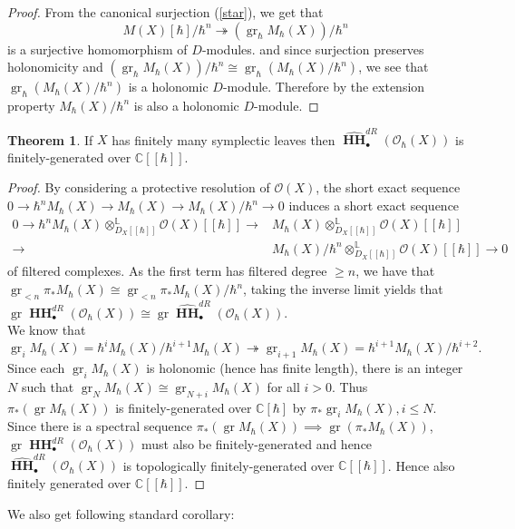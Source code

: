 \documentclass[draft]{article}
\theoremstyle{definition}
\newtheorem{theorem}{Theorem}[section]
\DeclareMathOperator{\gr}{gr}
\DeclareMathOperator{\HH}{\mathbf{HH}}
\newcommand{\doubleh}{[\![ \hbar ]\!]}
\newcommand{\OhX}{\mathcal{O}_\hbar(X)}
\newcommand{\MhX}{M_\hbar(X)}
\newcommand{\OXh}{\mathcal{O}(X)\doubleh}
\begin{document}
\begin{proof}
From the canonical surjection (\ref{star}), we get that $$M(X)[\hbar]/\hbar^n\twoheadrightarrow (\gr_\hbar \MhX)/\hbar^n$$ is a surjective homomorphism of $D$-modules. and since surjection preserves holonomicity and $(\gr_\hbar \MhX)/\hbar^n\cong \gr_\hbar (\MhX/\hbar^n)$, we see that $\gr_\hbar (\MhX/\hbar^n)$ is a holonomic $D$-module. Therefore by the extension property $\MhX/\hbar^n$ is also a holonomic $D$-module.

\end{proof}


\begin{theorem}
If $X$ has finitely many symplectic leaves then $\widehat{\HH}^{dR}_\bullet(\OhX)$ is finitely-generated over $\mathbb{C}\doubleh$.
\end{theorem}

\begin{proof}
By considering a protective resolution of $\mathcal{O}(X)$, the short exact sequence $0\to\hbar^n\MhX\to \MhX\to \MhX/\hbar^n\to 0$ induces a short exact sequence 
\begin{align*}
    0\to\hbar^n \MhX\otimes^{\mathbb{L}}_{D_X\doubleh}\OXh\to&\MhX\otimes^{\mathbb{L}}_{D_X\doubleh}\OXh\\
    \to& \MhX/\hbar^n \otimes^{\mathbb{L}}_{D_X\doubleh}\OXh\to 0
\end{align*}
 of filtered complexes. As the first term has filtered degree $\geq n$, we have that $\gr_{<n} \pi_* \MhX\cong \gr_{<n} \pi_* \MhX/\hbar^n$, taking the inverse limit yields that $\gr \HH^{dR}_{\bullet}(\OhX)\cong\gr \widehat{\HH}_{\bullet}^{dR}(\OhX)$. \\

We know that $$\gr_i \MhX =\hbar^i\MhX/\hbar^{i+1}\MhX\twoheadrightarrow \gr_{i+1} \MhX =\hbar^{i+1}\MhX/\hbar^{i+2}.$$ Since each $\gr_i \MhX$ is holonomic (hence has finite length), there is an integer $N$ such that $\gr_N \MhX \cong \gr_{N+i} \MhX $ for all $i>0$. Thus $\pi_* (\gr \MhX)$ is finitely-generated over $\mathbb{C}[\hbar]$ by $\pi_* \gr_i\MhX, i\leq N$. Since there is a spectral sequence $\pi_*(\gr\MhX)\implies\gr(\pi_*\MhX)$, $\gr \HH^{dR}_{\bullet}(\OhX)$ must also be finitely-generated and hence $\widehat{\HH}^{dR}_\bullet(\OhX)$ is topologically finitely-generated over $\mathbb{C}\doubleh$. Hence also finitely generated over $\mathbb{C}\doubleh$.
\end{proof}

We also get following standard corollary:
\end{document}
